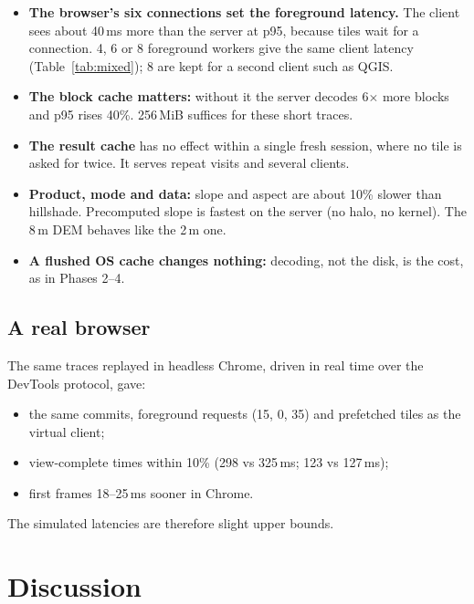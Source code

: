 \documentclass[11pt,a4paper]{article}
\begin{document}
\begin{itemize}
  \item \textbf{The browser's six connections set the foreground latency.} The client sees about 40\,ms more than
  the server at p95, because tiles wait for a connection. 4, 6 or 8 foreground workers give the same client latency
  (Table~\ref{tab:mixed}); 8 are kept for a second client such as QGIS.
  \item \textbf{The block cache matters:} without it the server decodes 6$\times$ more blocks and p95 rises 40\%.
  256\,MiB suffices for these short traces.
  \item \textbf{The result cache} has no effect within a single fresh session, where no tile is asked for twice. It
  serves repeat visits and several clients.
  \item \textbf{Product, mode and data:} slope and aspect are about 10\% slower than hillshade. Precomputed slope is
  fastest on the server (no halo, no kernel). The 8\,m DEM behaves like the 2\,m one.
  \item \textbf{A flushed OS cache changes nothing:} decoding, not the disk, is the cost, as in Phases 2--4.
\end{itemize}

\subsection{A real browser}
The same traces replayed in headless Chrome, driven in real time over the DevTools protocol, gave:
\begin{itemize}
  \item the same commits, foreground requests (15, 0, 35) and prefetched tiles as the virtual client;
  \item view-complete times within 10\% (298 vs 325\,ms; 123 vs 127\,ms);
  \item first frames 18--25\,ms sooner in Chrome.
\end{itemize}
The simulated latencies are therefore slight upper bounds.

\section{Discussion}
\end{document}
